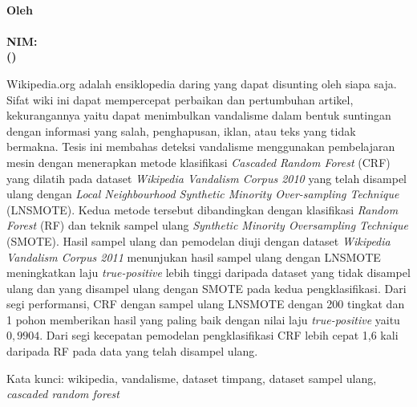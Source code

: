 \begin{center}
\textbf{\large
	\MakeUppercase{\judul{}} \\
	\bigskip
	\textnormal{Oleh} \\
	\myname{} \\
	NIM: \mysid{} \\
	(\mydept{}) \\
}
\end{center}

\bigskip
\bigskip
\bigskip

Wikipedia.org adalah ensiklopedia daring yang dapat disunting oleh siapa saja.
Sifat wiki ini dapat mempercepat perbaikan dan pertumbuhan artikel,
kekurangannya yaitu dapat menimbulkan vandalisme dalam bentuk suntingan dengan
informasi yang salah, penghapusan, iklan, atau teks yang tidak bermakna.
Tesis ini membahas deteksi vandalisme menggunakan pembelajaran mesin
dengan menerapkan metode klasifikasi
\textit{Cascaded Random Forest} (CRF)
yang dilatih pada dataset
\textit{Wikipedia Vandalism Corpus 2010}
yang telah
disampel ulang dengan
\textit{Local Neighbourhood Synthetic Minority Over-sampling Technique}
(LNSMOTE).
Kedua metode tersebut dibandingkan dengan klasifikasi
\textit{Random Forest} (RF)
dan teknik sampel ulang
\textit{Synthetic Minority Oversampling Technique} (SMOTE).
Hasil sampel ulang dan pemodelan diuji dengan dataset
\textit{Wikipedia Vandalism Corpus 2011}
menunjukan hasil sampel ulang dengan LNSMOTE meningkatkan laju
\textit{true-positive} lebih tinggi daripada dataset yang tidak disampel ulang
dan yang disampel ulang dengan SMOTE pada kedua pengklasifikasi.
Dari segi performansi, CRF dengan sampel ulang LNSMOTE dengan 200 tingkat dan 1
pohon memberikan hasil yang paling baik dengan nilai laju
\textit{true-positive} yaitu $0,9904$.
Dari segi kecepatan pemodelan pengklasifikasi CRF lebih cepat 1,6 kali daripada
RF pada data yang telah disampel ulang.

Kata kunci: wikipedia, vandalisme, dataset timpang, dataset sampel ulang,
\textit{cascaded random forest}
